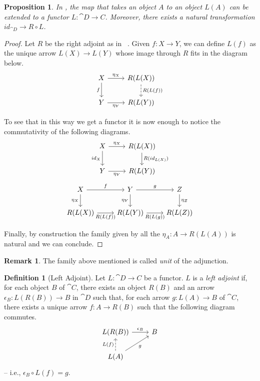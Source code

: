 \documentclass[a4paper, twoside,openright]{report}
\theoremstyle{plain}
\newtheorem{prop}[theorem]{Proposition}
\theoremstyle{definition}
\newtheorem{definition}[theorem]{Definition}
\newtheorem{remark}[theorem]{Remark}
\begin{document}
\begin{prop}\label{prop:ext_left_to_funct}
    In , the map that takes an object $A$ to an object $L(A)$ can be extended to a functor $L: \cat{D \rightarrow C}$. Moreover, there exists a natural transformation $id_{\cat{D}}\to R\circ L$.
\end{prop}
\begin{proof}
    Let $R$ be the right adjoint as in ~. Given $f\colon X \rightarrow Y$, we can define $L(f)$ as the unique arrow  $L(X) \rightarrow L(Y)$ whose image through $R$ fits in the diagram below.
    \[
    \begin{tikzcd}
    	X \arrow[r, "{\eta_X}"] \arrow[d, "f" swap] & R(L(X)) \arrow[d, dashed, "R(L(f))"] \\
    	Y\arrow[r, "\eta_Y" swap]& R(L(Y))
    \end{tikzcd}
    \]
    
    To see that in this way we get a functor it is now enough to notice the commutativity of the following diagrams.
    \[
    \begin{tikzcd}
    	X \arrow[r, "{\eta_X}"] \arrow[d, "{id_X}" swap] & R(L(X)) \arrow[d, "{R(id_{L(X)})}"]   \\
    	Y\arrow[r, "{\eta_Y}" swap] & R(L(Y))
    \end{tikzcd}
    \]    \[
    \begin{tikzcd}
    	   X \arrow[d, "{\eta_X}" swap]  \arrow[r, "{f}"]& Y \arrow[d, "{\eta_Y}" swap] \arrow[r, "{g}"]& Z\arrow[d, "{\eta_Z}"]\\
    	R(L(X))  \arrow[r, "{R(L(f))}" swap] & R(L(Y)) \arrow[r, "{R(L(g))}" swap] & R(L(Z))
    \end{tikzcd}
    \]
    
    Finally, by construction the family given by all the $\eta_A\colon A\to R(L(A))$ is natural and we can conclude. 
\end{proof}

\begin{remark}
    The family above mentioned is called \emph{unit} of the adjunction.
\end{remark}

\begin{definition}[Left Adjoint]\label{def:left_adjoint}
    Let $L: \cat{D \rightarrow C}$ be a functor. $L$ is a \emph{left adjoint} if, for each object $B$ of $\cat C$, there exists an object $R(B)$ and an arrow $\epsilon_B : L(R(B)) \rightarrow B$ in $\cat D$ such that, for each arrow $g: L(A) \rightarrow B$ of $\cat C$, there exists a unique arrow $f:A \rightarrow R(B)$ such that the following diagram commutes.
    \[
        \begin{tikzcd}
            L(R(B)) \arrow[r, "{\epsilon_B}"] & B \\
            L(A) \arrow[u, dashed, "L(f)"] \arrow[ur, "g"swap]
        \end{tikzcd}
    \]
    -- i.e., $\epsilon_B \circ L(f) = g$.
\end{definition}
\end{document}
